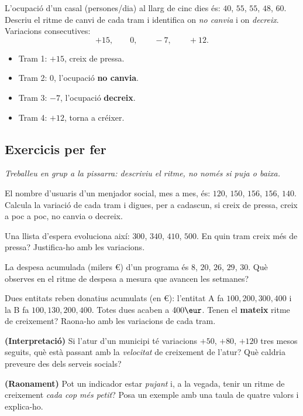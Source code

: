\begin{exresolt}
L'ocupació d'un casal (persones/dia) al llarg de cinc dies és: $40$, $55$, $55$, $48$,
$60$. Descriu el ritme de canvi de cada tram i identifica on \emph{no canvia} i on
\emph{decreix}.
\solucio
Variacions consecutives:
\[
+15,\qquad 0,\qquad -7,\qquad +12.
\]
\begin{itemize}[leftmargin=1.4em, itemsep=2pt]
  \item Tram 1: $+15$, creix de pressa.
  \item Tram 2: $0$, l'ocupació \textbf{no canvia}.
  \item Tram 3: $-7$, l'ocupació \textbf{decreix}.
  \item Tram 4: $+12$, torna a créixer.
\end{itemize}
\end{exresolt}

\subsection{Exercicis per fer}

\noindent\textit{Treballeu en grup a la pissarra: descriviu el ritme, no només si puja
o baixa.}

\begin{exercicis}
\begin{exlist}
  \item El nombre d'usuaris d'un menjador social, mes a mes, és: $120$, $150$, $156$,
        $156$, $140$. Calcula la variació de cada tram i digues, per a cadascun, si
        creix de pressa, creix a poc a poc, no canvia o decreix.
  \item Una llista d'espera evoluciona així: $300$, $340$, $410$, $500$. En quin tram
        creix més de pressa? Justifica-ho amb les variacions.
  \item La despesa acumulada (milers \euro) d'un programa és $8$, $20$, $26$, $29$,
        $30$. Què observes en el ritme de despesa a mesura que avancen les setmanes?
  \item Dues entitats reben donatius acumulats (en \euro): l'entitat A fa
        $100, 200, 300, 400$ i la B fa $100, 130, 200, 400$. Totes dues acaben a
        $400\eur$. Tenen el \textbf{mateix} ritme de creixement? Raona-ho amb les
        variacions de cada tram.
  \item \textbf{(Interpretació)} Si l'atur d'un municipi té variacions $+50$, $+80$,
        $+120$ tres mesos seguits, què està passant amb la \emph{velocitat} de
        creixement de l'atur? Què caldria preveure des dels serveis socials?
  \item \textbf{(Raonament)} Pot un indicador estar \emph{pujant} i, a la vegada, tenir
        un ritme de creixement \emph{cada cop més petit}? Posa un exemple amb una taula
        de quatre valors i explica-ho.
\end{exlist}
\end{exercicis}

